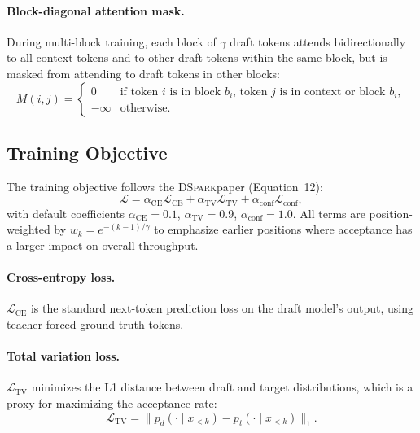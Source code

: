 \documentclass[11pt,a4paper]{article}
\newcommand{\DSpark}{\textsc{DSpark}}
\begin{document}
\paragraph{Block-diagonal attention mask.}
During multi-block training, each block of $\gamma$ draft tokens attends
bidirectionally to all context tokens and to other draft tokens within the
same block, but is masked from attending to draft tokens in other blocks:
\begin{equation}
  M(i,j) = \begin{cases}
    0 &\text{if token $i$ is in block $b_i$, token $j$ is in context or block $b_i$},\\
    -\infty &\text{otherwise}.
  \end{cases}
\end{equation}

\subsection{Training Objective}
\label{subsec:training}

The training objective follows the \DSpark paper (Equation~12):
\begin{equation}
  \mathcal{L} = \alpha_\text{CE} \mathcal{L}_\text{CE} + \alpha_\text{TV} \mathcal{L}_\text{TV} + \alpha_\text{conf} \mathcal{L}_\text{conf},
\end{equation}
with default coefficients $\alpha_\text{CE}=0.1$, $\alpha_\text{TV}=0.9$,
$\alpha_\text{conf}=1.0$. All terms are position-weighted by
$w_k = e^{-(k-1)/\gamma}$ to emphasize earlier positions where acceptance
has a larger impact on overall throughput.

\paragraph{Cross-entropy loss.}
$\mathcal{L}_\text{CE}$ is the standard next-token prediction loss on the
draft model's output, using teacher-forced ground-truth tokens.

\paragraph{Total variation loss.}
$\mathcal{L}_\text{TV}$ minimizes the L1 distance between draft and target
distributions, which is a proxy for maximizing the acceptance rate:
\begin{equation}
  \mathcal{L}_\text{TV} = \|p_d(\cdot \mid x_{<k}) - p_t(\cdot \mid x_{<k})\|_1.
\end{equation}
\end{document}
